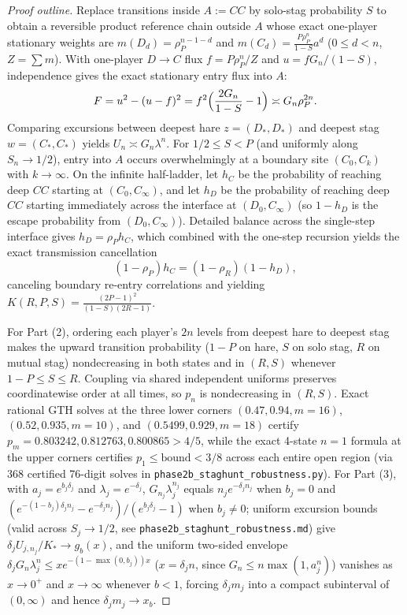 \documentclass[11pt,reqno]{amsart}
\theoremstyle{definition}
\theoremstyle{remark}
\begin{document}
\begin{proof}[Proof outline]
Replace transitions inside $A := CC$ by solo-stag probability $S$ to obtain a reversible product reference chain outside $A$ whose exact one-player stationary weights are $m(D_d) = \rho_P^{n-1-d}$ and $m(C_d) = \frac{P\rho_P^n}{1-S} a^d$ ($0 \le d < n$, $Z = \sum m$). With one-player $D\to C$ flux $f = P\rho_P^n / Z$ and $u = f G_n / (1-S)$, independence gives the exact stationary entry flux into $A$:
\begin{equation}\label{eq:ref-flux}
  F = u^2 - (u - f)^2 = f^2\Bigl(\frac{2G_n}{1-S} - 1\Bigr) \asymp G_n \rho_P^{2n}.
\end{equation}
Comparing excursions between deepest hare $z = (D_*,D_*)$ and deepest stag $w = (C_*,C_*)$ yields $U_n \asymp G_n \lambda^n$. For $1/2 \le S < P$ (and uniformly along $S_n \to 1/2$), entry into $A$ occurs overwhelmingly at a boundary site $(C_0, C_k)$ with $k \to \infty$. On the infinite half-ladder, let $h_C$ be the probability of reaching deep $CC$ starting at $(C_0, C_\infty)$, and let $h_D$ be the probability of reaching deep $CC$ starting immediately across the interface at $(D_0, C_\infty)$ (so $1 - h_D$ is the escape probability from $(D_0, C_\infty)$). Detailed balance across the single-step interface gives $h_D = \rho_P h_C$, which combined with the one-step recursion yields the exact transmission cancellation
\begin{equation}\label{eq:ladder-cancel}
  (1 - \rho_P) h_C = (1 - \rho_R)(1 - h_D),
\end{equation}
canceling boundary re-entry correlations and yielding $K(R,P,S) = \frac{(2P-1)^2}{(1-S)(2R-1)}$.

For Part (2), ordering each player's $2n$ levels from deepest hare to deepest stag makes the upward transition probability ($1-P$ on hare, $S$ on solo stag, $R$ on mutual stag) nondecreasing in both states and in $(R,S)$ whenever $1-P \le S \le R$. Coupling via shared independent uniforms preserves coordinatewise order at all times, so $p_n$ is nondecreasing in $(R,S)$. Exact rational GTH solves at the three lower corners $(0.47,0.94,m=16)$, $(0.52,0.935,m=10)$, and $(0.5499,0.929,m=18)$ certify $p_m = 0.803242, 0.812763, 0.800865 > 4/5$, while the exact 4-state $n=1$ formula at the upper corners certifies $p_1 \le \text{bound} < 3/8$ across each entire open region (via 368 certified 76-digit solves in \texttt{phase2b\_staghunt\_robustness.py}). For Part (3), with $a_j = e^{b_j \delta_j}$ and $\lambda_j = e^{-\delta_j}$, $G_{n_j}\lambda_j^{n_j}$ equals $n_j e^{-\delta_j n_j}$ when $b_j = 0$ and $(e^{-(1-b_j)\delta_j n_j} - e^{-\delta_j n_j})/(e^{b_j\delta_j}-1)$ when $b_j \neq 0$; uniform excursion bounds (valid across $S_j \to 1/2$, see \texttt{phase2b\_staghunt\_robustness.md}) give $\delta_j U_{j,n_j}/K_* \to g_b(x)$, and the uniform two-sided envelope $\delta_j G_n \lambda_j^n \le x e^{-(1 - \max(0, b_j)) x}$ ($x = \delta_j n$, since $G_n \le n \max(1, a_j^n)$) vanishes as $x \to 0^+$ and $x \to \infty$ whenever $b < 1$, forcing $\delta_j m_j$ into a compact subinterval of $(0,\infty)$ and hence $\delta_j m_j \to x_b$.
\end{proof}
\end{document}
